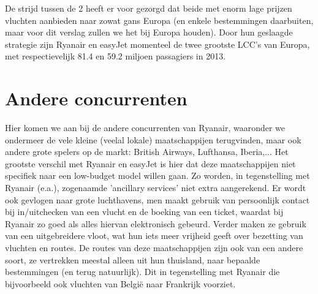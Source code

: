 \documentclass{article}
\begin{document}
De strijd tussen de 2 heeft er voor gezorgd dat beide met enorm lage prijzen vluchten aanbieden naar zowat gans Europa (en enkele bestemmingen daarbuiten, maar voor dit verslag zullen we het bij Europa houden). Door hun geslaagde strategie zijn Ryanair en easyJet momenteel de twee grootste LCC's van Europa, met respectievelijk 81.4 en 59.2 miljoen passagiers in 2013.

\section{Andere concurrenten}

Hier komen we aan bij de andere concurrenten van Ryanair, waaronder we ondermeer de vele kleine (veelal lokale) maatschappijen terugvinden, maar ook andere grote spelers op de markt: British Airways, Lufthansa, Iberia,... 
Het grootste verschil met Ryanair en easyJet is hier dat deze maatschappijen niet specifiek naar een low-budget model willen gaan. Zo worden, in tegenstelling met Ryanair (e.a.), zogenaamde 'ancillary services' niet extra aangerekend. Er wordt ook gevlogen naar grote luchthavens, men maakt gebruik van persoonlijk contact bij in/uitchecken van een vlucht en de boeking van een ticket, waardat bij Ryanair zo goed als alles hiervan elektronisch gebeurd. Verder maken ze gebruik van een uitgebreidere vloot, wat hun iets meer vrijheid geeft over bezetting van vluchten en routes.
De routes van deze maatschappijen zijn ook van een andere soort, ze vertrekken meestal alleen uit hun thuisland, naar bepaalde bestemmingen (en terug natuurlijk). Dit in tegenstelling met Ryanair die bijvoorbeeld ook vluchten van Belgi\"e naar Frankrijk voorziet.
\end{document}

